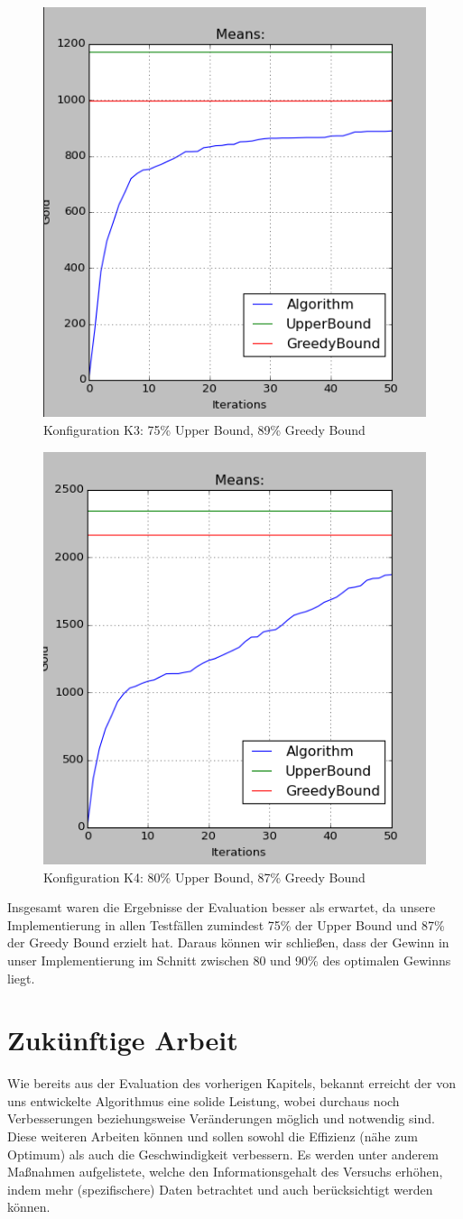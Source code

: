 \documentclass[fleqn,10pt]{SelfArx} %
\begin{document}
\label{fig:eval2}
\begin{figure}
  \centering
  \includegraphics[width=.4\textwidth]{10ad_15ag_50r_50it_cut.png}
  \caption{Konfiguration K3: 75\% Upper Bound, 89\% Greedy Bound}
\end{figure}
\label{fig:eval3}
\begin{figure}
  \centering
  \includegraphics[width=.4\textwidth]{20ad_15ag_50r_50it_cut.png}
  \caption{Konfiguration K4: 80\% Upper Bound, 87\% Greedy Bound}
\end{figure}
\label{fig:eval4}
Insgesamt waren die Ergebnisse der Evaluation besser als erwartet, da unsere Implementierung in allen Testfällen zumindest 75\% der Upper Bound und 87\% der Greedy Bound erzielt hat. Daraus können wir schließen, dass der Gewinn in unser Implementierung im Schnitt zwischen 80 und 90\% des optimalen Gewinns liegt.
\section{Zukünftige Arbeit}
\label{sec:Future}

Wie bereits aus der Evaluation des vorherigen Kapitels, bekannt erreicht der von uns entwickelte Algorithmus eine solide Leistung, wobei durchaus noch Verbesserungen beziehungsweise Veränderungen möglich und notwendig sind. Diese weiteren Arbeiten können und sollen sowohl die Effizienz (nähe zum Optimum) als auch die Geschwindigkeit verbessern. Es werden unter anderem Maßnahmen aufgelistete, welche den Informationsgehalt des Versuchs erhöhen, indem mehr (spezifischere) Daten betrachtet und auch berücksichtigt werden können.
\end{document}
